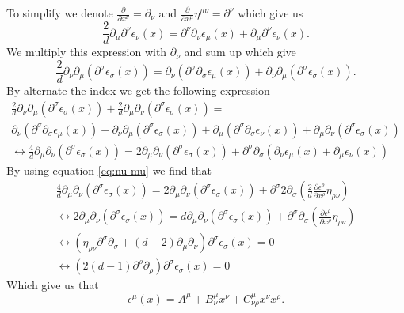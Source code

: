 To simplify we denote $\frac{\partial}{\partial x^\nu}=\partial _\nu$ and $\frac{\partial}{\partial x^\mu}\eta^{\mu \nu}=\partial^\nu$ which give us   
\[%
\frac{2}{d} \partial_\mu \partial^\nu \epsilon_\nu(x) =\partial^\nu \partial_\nu \epsilon_\mu(x)+\partial_\mu \partial^\nu \epsilon_\nu(x).
\]
We multiply this expression with $\partial _\nu$ and sum up which give
\[
\frac{2}{d}\partial_\nu \partial_\mu(\partial^\sigma \epsilon_\sigma(x))=\partial_\nu(\partial^\sigma \partial_\sigma\epsilon_\mu (x))+\partial_\nu \partial_\mu(\partial^\sigma \epsilon_\sigma(x)).
\]
By alternate the index we get the following expression
\begin{gather*}
\frac{2}{d}\partial_\nu \partial_\mu(\partial^\sigma \epsilon_\sigma(x))+\frac{2}{d}\partial_\mu \partial_\nu(\partial^\sigma \epsilon_\sigma(x))=\\\partial_\nu(\partial^\sigma \partial_\sigma\epsilon_\mu (x))+\partial_\nu \partial_\mu(\partial^\sigma \epsilon_\sigma(x))+\partial_\mu(\partial^\sigma \partial_\sigma\epsilon_\nu (x))+\partial_\mu \partial_\nu(\partial^\sigma \epsilon_\sigma(x))\\ \leftrightarrow
\frac{4}{d}\partial_\mu \partial_\nu(\partial^\sigma \epsilon_\sigma(x))=2\partial_\mu \partial_\nu(\partial^\sigma \epsilon_\sigma(x))+\partial^\sigma \partial_\sigma(\partial_\nu \epsilon_\mu(x) +\partial_\mu \epsilon_\nu(x))
\end{gather*}
By using equation \ref{eq:nu mu} we find that
\begin{gather*}
\frac{4}{d}\partial_\mu \partial_\nu(\partial^\sigma \epsilon_\sigma(x))=2\partial_\mu \partial_\nu(\partial^\sigma \epsilon_\sigma(x))+\partial^\sigma2 \partial_\sigma(\frac{2}{d}\frac{ \partial \epsilon ^\rho}{ \partial x^\rho } \eta_{\rho \nu})\\\leftrightarrow 2\partial_\mu \partial_\nu(\partial^\sigma \epsilon_\sigma(x))=d\partial_\mu \partial_\nu(\partial^\sigma \epsilon_\sigma(x))+\partial^\sigma \partial_\sigma (\frac{ \partial \epsilon ^\rho}{ \partial x^\rho } \eta_{\rho \nu})\\ \leftrightarrow (\eta_{\rho \nu}\partial^\sigma \partial_\sigma+(d-2)\partial_\mu \partial_\nu)\partial^\sigma \epsilon_\sigma(x)=0\\
\leftrightarrow (2(d-1)\partial^\rho \partial_\rho)\partial^\sigma \epsilon_\sigma(x)=0
\end{gather*}
 Which give us that 
 \[
 \epsilon^\mu(x)=A^\mu +B^\mu _\nu x^\nu+ C^\mu _{\nu \rho} x^\nu x^\rho.
 \]
 
